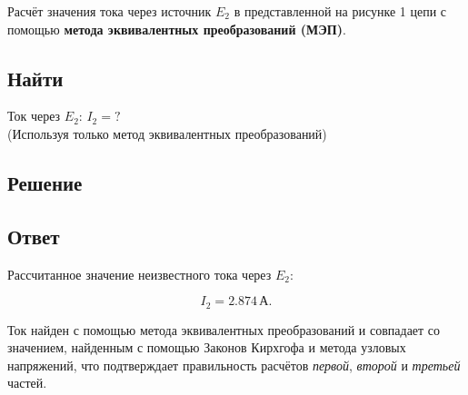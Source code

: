 Расчёт значения тока через источник $E_2$ в представленной на рисунке 1 цепи с помощью \textbf{метода эквивалентных преобразований (МЭП)}.

\subsection{Найти}
Ток через $E_2$: \(I_2 = ?\) \\
(Используя только метод эквивалентных преобразований)

\subsection{Решение}


\subsection{Ответ}
Рассчитанное значение неизвестного тока через $E_2$:

\[
	I_2 = 2.874 \, \text{А}.
\]

Ток найден с помощью метода эквивалентных преобразований и совпадает со значением, найденным с помощью Законов Кирхгофа и метода узловых напряжений, что подтверждает правильность расчётов \textit{первой}, \textit{второй} и \textit{третьей} частей.
